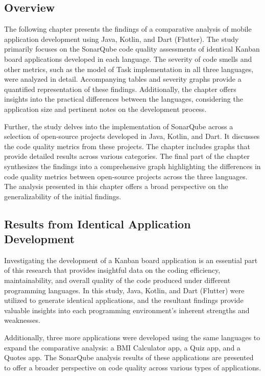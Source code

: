 \subsection{Overview}
The following chapter presents the findings of a comparative analysis of mobile application development using Java, Kotlin, and Dart (Flutter). The study primarily focuses on the SonarQube code quality assessments of identical Kanban board applications developed in each language. The severity of code smells and other metrics, such as the model of Task implementation in all three languages, were analyzed in detail. Accompanying tables and severity graphs provide a quantified representation of these findings. Additionally, the chapter offers insights into the practical differences between the languages, considering the application size and pertinent notes on the development process.
\par
Further, the study delves into the implementation of SonarQube across a selection of open-source projects developed in Java, Kotlin, and Dart. It discusses the code quality metrics from these projects. The chapter includes graphs that provide detailed results across various categories. The final part of the chapter synthesizes the findings into a comprehensive graph highlighting the differences in code quality metrics between open-source projects across the three languages. The analysis presented in this chapter offers a broad perspective on the generalizability of the initial findings.

\subsection{Results from Identical Application Development}
Investigating the development of a Kanban board application is an essential part of this research that provides insightful data on the coding efficiency, maintainability, and overall quality of the code produced under different programming languages. In this study, Java, Kotlin, and Dart (Flutter) were utilized to generate identical applications, and the resultant findings provide valuable insights into each programming environment's inherent strengths and weaknesses. 
\par
Additionally, three more applications were developed using the same languages to expand the comparative analysis: a BMI Calculator app, a Quiz app, and a Quotes app. The SonarQube analysis results of these applications are presented to offer a broader perspective on code quality across various types of applications.
